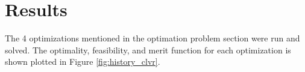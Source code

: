 \documentclass[conf]{new-aiaa}
\begin{document}


\section{Results}
\label{sec:results}
The 4 optimizations mentioned in the optimation problem section were run and solved.
The optimality, feasibility, and merit function for each optimization is shown plotted in Figure \ref{fig:history_clvr}.

\end{document}
